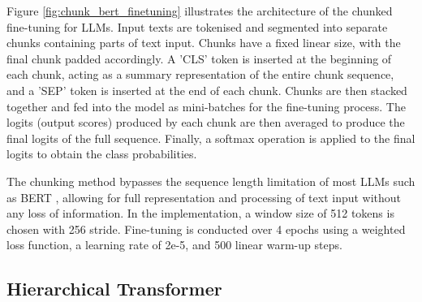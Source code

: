Figure \ref{fig:chunk_bert_finetuning} illustrates the architecture of the chunked fine-tuning for LLMs. Input texts are tokenised and segmented into separate chunks containing parts of text input. Chunks have a fixed linear size, with the final chunk padded accordingly. A 'CLS' token is inserted at the beginning of each chunk, acting as a summary representation of the entire chunk sequence, and a 'SEP' token is inserted at the end of each chunk. Chunks are then stacked together and fed into the model as mini-batches for the fine-tuning process. The logits (output scores) produced by each chunk are then averaged to produce the final logits of the full sequence. Finally, a softmax operation is applied to the final logits to obtain the class probabilities.

The chunking method bypasses the sequence length limitation of most LLMs such as BERT \cite{devlin-2019-bert}, allowing for full representation and processing of text input without any loss of information. In the implementation, a window size of 512 tokens is chosen with 256 stride. Fine-tuning is conducted over 4 epochs using a weighted loss function, a learning rate of 2e-5, and 500 linear warm-up steps.


\subsection{Hierarchical Transformer}

